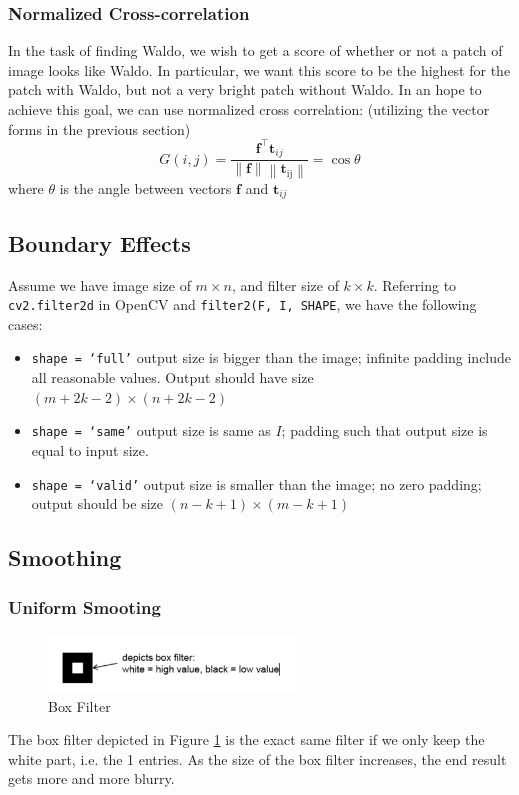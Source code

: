 \documentclass[11pt]{article}
\renewcommand{\bf}{\mathbf{f}}
\newcommand{\bt}{\mathbf{t}}
\begin{document}

\subsubsection{Normalized Cross-correlation}
In the task of finding Waldo, we wish to get a score of whether or not a patch of image looks like Waldo. In particular, we want this score to be the highest for the patch with Waldo, but not a very bright patch without Waldo. In an hope to achieve this goal, we can use normalized cross correlation: (utilizing the vector forms in the previous section)
\begin{equation}
	G(i, j)=\frac{\mathbf{f}^\top \mathbf{t}_{i j}}{\|\mathbf{f}\|\left\|\mathbf{t}_{\mathrm{ij}}\right\|} = \cos \theta
\end{equation}
where $\theta$ is the angle between vectors $\bf$ and $\bt_{ij}$

\subsection{Boundary Effects}
Assume we have image size of $m \times n$, and filter size of $k \times k$. Referring to \texttt{cv2.filter2d} in OpenCV and \texttt{filter2(F, I, SHAPE}, we have the following cases: 
\begin{itemize}
	\item \texttt{shape = `full'} output size is bigger than the image; infinite padding include all reasonable values. Output should have size $(m + 2k - 2) \times ( n + 2k - 2)$
	\item \texttt{shape = `same'} output size is same as $I$; padding such that output size is equal to input size. 
	\item \texttt{shape = `valid'} output size is smaller than the image; no zero padding; output should be size $(n - k + 1) \times (m - k + 1) $
\end{itemize}

\subsection{Smoothing}
\subsubsection{Uniform Smooting}
\begin{figure}[H]
	\center\includegraphics[width=0.6\textwidth]{figs/box_filter}
	\caption{Box Filter}\label{fig:box_filter}
\end{figure}
The box filter depicted in Figure \ref{fig:box_filter} is the exact same filter if we only keep the white part, i.e. the 1 entries. As the size of the box filter increases, the end result gets more and more blurry. 
\end{document}
